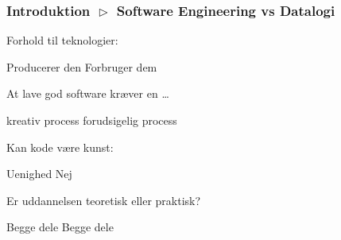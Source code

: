 \begin{frame}[fragile]
  \frametitle{Introduktion $\vartriangleright$ Software Engineering vs Datalogi}
  \vspace{-1mm}
  Forhold til teknologier:
  \begin{itemize}
     Producerer den
     Forbruger dem
  \end{itemize}
  
  \pause
  \vspace{2mm}
  At lave god software kræver en \ldots
  \begin{itemize}
     kreativ process
     forudsigelig process
  \end{itemize}
  
  \pause
  \vspace{2mm}
  Kan kode være kunst:
  \begin{itemize}
     Uenighed
     Nej
  \end{itemize}
  
  \pause
  \vspace{2mm}
  Er uddannelsen teoretisk eller praktisk?
  \begin{itemize}
     Begge dele
     Begge dele
  \end{itemize}
\end{frame}

